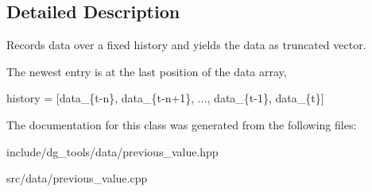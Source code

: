 \subsection{Detailed Description}
Records data over a fixed history and yields the data as truncated vector. 

The newest entry is at the last position of the data array,

history = \mbox{[}data\+\_\+\{t-\/n\}, data\+\_\+\{t-\/n+1\}, ..., data\+\_\+\{t-\/1\}, data\+\_\+\{t\}\mbox{]} 

The documentation for this class was generated from the following files\+:\begin{DoxyCompactItemize}
\item 
include/dg\+\_\+tools/data/previous\+\_\+value.\+hpp\item 
src/data/previous\+\_\+value.\+cpp\end{DoxyCompactItemize}
